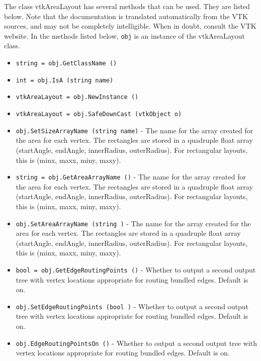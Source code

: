 The class vtkAreaLayout has several methods that can be used.
  They are listed below.
Note that the documentation is translated automatically from the VTK sources,
and may not be completely intelligible.  When in doubt, consult the VTK website.
In the methods listed below, \verb|obj| is an instance of the vtkAreaLayout class.
\begin{itemize}
\item  \verb|string = obj.GetClassName ()|

\item  \verb|int = obj.IsA (string name)|

\item  \verb|vtkAreaLayout = obj.NewInstance ()|

\item  \verb|vtkAreaLayout = obj.SafeDownCast (vtkObject o)|

\item  \verb|obj.SetSizeArrayName (string name)| -  The name for the array created for the area for each vertex.
 The rectangles are stored in a quadruple float array
 (startAngle, endAngle, innerRadius, outerRadius).
 For rectangular layouts, this is (minx, maxx, miny, maxy).

\item  \verb|string = obj.GetAreaArrayName ()| -  The name for the array created for the area for each vertex.
 The rectangles are stored in a quadruple float array
 (startAngle, endAngle, innerRadius, outerRadius).
 For rectangular layouts, this is (minx, maxx, miny, maxy).

\item  \verb|obj.SetAreaArrayName (string )| -  The name for the array created for the area for each vertex.
 The rectangles are stored in a quadruple float array
 (startAngle, endAngle, innerRadius, outerRadius).
 For rectangular layouts, this is (minx, maxx, miny, maxy).

\item  \verb|bool = obj.GetEdgeRoutingPoints ()| -  Whether to output a second output tree with vertex locations
 appropriate for routing bundled edges. Default is on.

\item  \verb|obj.SetEdgeRoutingPoints (bool )| -  Whether to output a second output tree with vertex locations
 appropriate for routing bundled edges. Default is on.

\item  \verb|obj.EdgeRoutingPointsOn ()| -  Whether to output a second output tree with vertex locations
 appropriate for routing bundled edges. Default is on.


\end{itemize}
